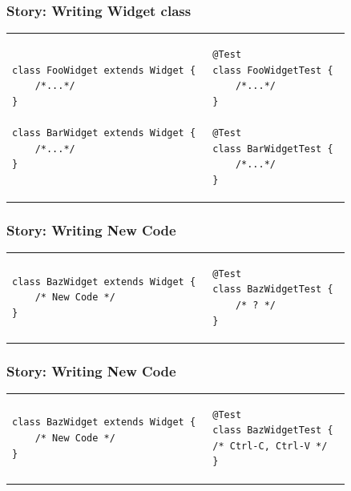 \documentclass{beamer}
\begin{document}
\begin{frame}[fragile]
  \frametitle{Story: Writing Widget class}
  {
     \begin{tabular}{ll}
        \begin{minipage}{0.4\textwidth}
\begin{lstlisting}[]
class FooWidget extends Widget { 
    /*...*/ 
}

class BarWidget extends Widget { 
    /*...*/ 
}
\end{lstlisting}
        \end{minipage}
        &
        \begin{minipage}{0.4\textwidth}
\begin{lstlisting}[]
@Test
class FooWidgetTest { 
    /*...*/ 
}

@Test
class BarWidgetTest { 
    /*...*/ 
}
\end{lstlisting}
        \end{minipage}
     \end{tabular}
  }
\end{frame}

\begin{frame}[fragile]
  \frametitle{Story: Writing New Code}
     \begin{tabular}{ll}
        \begin{minipage}{0.4\textwidth}
\begin{lstlisting}[]
class BazWidget extends Widget { 
    /* New Code */ 
}
\end{lstlisting}
        \end{minipage}
        &
        \begin{minipage}{0.4\textwidth}
\begin{lstlisting}[]
@Test
class BazWidgetTest { 
    /* ? */ 
}
\end{lstlisting}
        \end{minipage}
     \end{tabular}
  
\end{frame}

\begin{frame}[fragile]
  \frametitle{Story: Writing New Code}
     \begin{tabular}{ll}
        \begin{minipage}{0.4\textwidth}
\begin{lstlisting}[]
class BazWidget extends Widget { 
    /* New Code */ 
}
\end{lstlisting}
        \end{minipage}
        &
        \begin{minipage}{0.4\textwidth}
\begin{lstlisting}[]
@Test
class BazWidgetTest { 
/* Ctrl-C, Ctrl-V */ 
}
\end{lstlisting}
        \end{minipage}
     \end{tabular}
\end{frame}
\end{document}
